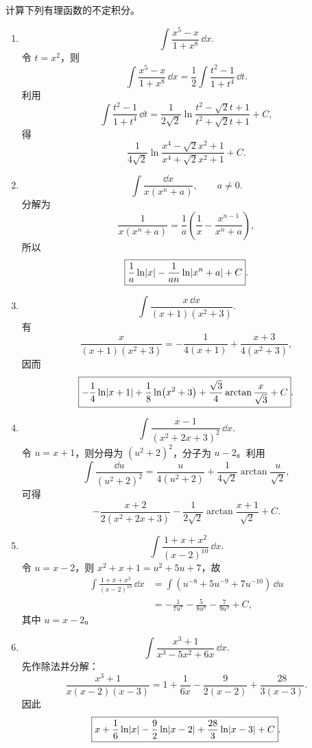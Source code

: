 \begin{xsolution}
计算下列有理函数的不定积分。
  \begin{enumerate}[label=(\arabic*)]
    \item
    \[
      \int\frac{x^5-x}{1+x^8}\,\dd x.
    \]
    令 $t=x^2$，则
    \[
      \int\frac{x^5-x}{1+x^8}\,\dd x
      =\frac12\int\frac{t^2-1}{1+t^4}\,\dd t.
    \]
    利用
    \[
      \int\frac{t^2-1}{1+t^4}\,\dd t
      =\frac1{2\sqrt2}
       \ln\frac{t^2-\sqrt2t+1}{t^2+\sqrt2t+1}+C,
    \]
    得
    \[
      \boxed{
      \frac1{4\sqrt2}
      \ln\frac{x^4-\sqrt2x^2+1}{x^4+\sqrt2x^2+1}+C}.
    \]

    \item
    \[
      \int\frac{\dd x}{x(x^n+a)},\qquad a\ne0.
    \]
    分解为
    \[
      \frac1{x(x^n+a)}
      =\frac1a\left(\frac1x-\frac{x^{n-1}}{x^n+a}\right),
    \]
    所以
    \[
      \boxed{
      \frac1a\ln\lvert x\rvert-\frac1{an}\ln\lvert x^n+a\rvert+C}.
    \]

    \item
    \[
      \int\frac{x\,\dd x}{(x+1)(x^2+3)}.
    \]
    有
    \[
      \frac{x}{(x+1)(x^2+3)}
      =-\frac1{4(x+1)}+\frac{x+3}{4(x^2+3)},
    \]
    因而
    \[
      \boxed{-\frac14\ln\lvert x+1\rvert
      +\frac18\ln(x^2+3)
      +\frac{\sqrt3}{4}\arctan\frac{x}{\sqrt3}+C}.
    \]

    \item
    \[
      \int\frac{x-1}{(x^2+2x+3)^2}\,\dd x.
    \]
    令 $u=x+1$，则分母为 $(u^2+2)^2$，分子为 $u-2$。利用
    \[
      \int\frac{\dd u}{(u^2+2)^2}
      =\frac{u}{4(u^2+2)}+\frac1{4\sqrt2}\arctan\frac{u}{\sqrt2},
    \]
    可得
    \[
      \boxed{-\frac{x+2}{2(x^2+2x+3)}
      -\frac1{2\sqrt2}\arctan\frac{x+1}{\sqrt2}+C}.
    \]

    \item
    \[
      \int\frac{1+x+x^2}{(x-2)^{10}}\,\dd x.
    \]
    令 $u=x-2$，则 $x^2+x+1=u^2+5u+7$，故
    \begin{align*}
      \int\frac{1+x+x^2}{(x-2)^{10}}\,\dd x
      &=\int(u^{-8}+5u^{-9}+7u^{-10})\,\dd u\\
      &=\boxed{-\frac1{7u^7}-\frac5{8u^8}-\frac7{9u^9}+C},
    \end{align*}
    其中 $u=x-2$。

    \item
    \[
      \int\frac{x^3+1}{x^3-5x^2+6x}\,\dd x.
    \]
    先作除法并分解：
    \[
      \frac{x^3+1}{x(x-2)(x-3)}
      =1+\frac1{6x}-\frac9{2(x-2)}+\frac{28}{3(x-3)}.
    \]
    因此
    \[
      \boxed{x+\frac16\ln\lvert x\rvert
      -\frac92\ln\lvert x-2\rvert
      +\frac{28}{3}\ln\lvert x-3\rvert+C}.
    \]


\end{enumerate}
\end{xsolution}

